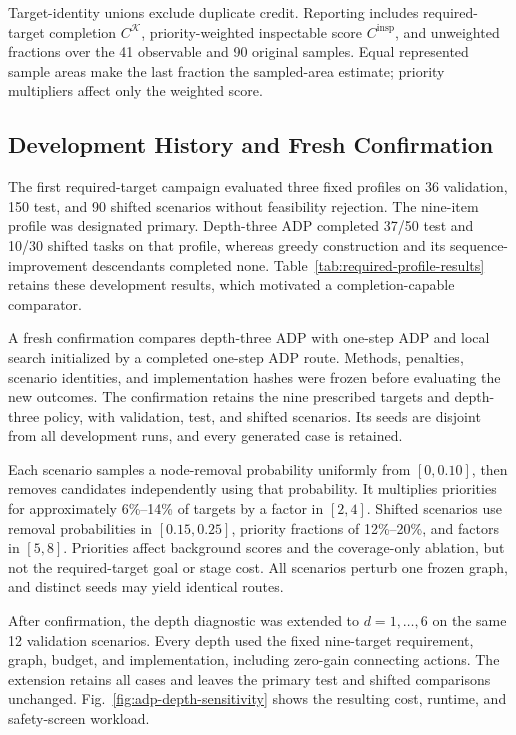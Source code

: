 Target-identity unions exclude duplicate credit. Reporting includes required-target completion $C^{\mathcal K}$, priority-weighted inspectable score $C^{\mathrm{insp}}$, and unweighted fractions over the 41 observable and 90 original samples. Equal represented sample areas make the last fraction the sampled-area estimate; priority multipliers affect only the weighted score.

\subsection{Development History and Fresh Confirmation}

The first required-target campaign evaluated three fixed profiles on 36 validation, 150 test, and 90 shifted scenarios without feasibility rejection. The nine-item profile was designated primary. Depth-three ADP completed 37/50 test and 10/30 shifted tasks on that profile, whereas greedy construction and its sequence-improvement descendants completed none. Table~\ref{tab:required-profile-results} retains these development results, which motivated a completion-capable comparator.

A fresh confirmation compares depth-three ADP with one-step ADP and local search initialized by a completed one-step ADP route. Methods, penalties, scenario identities, and implementation hashes were frozen before evaluating the new outcomes. The confirmation retains the nine prescribed targets and depth-three policy, with \RTValidationN{} validation, \RTTestN{} test, and \RTOodN{} shifted scenarios. Its seeds are disjoint from all development runs, and every generated case is retained.

Each scenario samples a node-removal probability uniformly from $[0,0.10]$, then removes candidates independently using that probability. It multiplies priorities for approximately 6\%--14\% of targets by a factor in $[2,4]$. Shifted scenarios use removal probabilities in $[0.15,0.25]$, priority fractions of 12\%--20\%, and factors in $[5,8]$. Priorities affect background scores and the coverage-only ablation, but not the required-target goal or stage cost. All scenarios perturb one frozen graph, and distinct seeds may yield identical routes.

After confirmation, the depth diagnostic was extended to $d=1,\ldots,6$ on the same 12 validation scenarios. Every depth used the fixed nine-target requirement, graph, budget, and implementation, including zero-gain connecting actions. The extension retains all cases and leaves the primary test and shifted comparisons unchanged. Fig.~\ref{fig:adp-depth-sensitivity} shows the resulting cost, runtime, and safety-screen workload.

